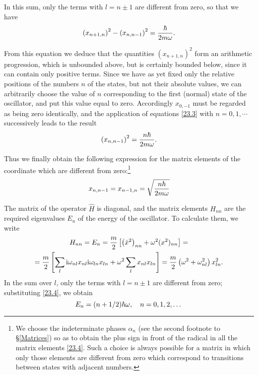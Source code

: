 In this sum, only the terms with $ l = n \pm 1 $ are different from zero, so that we have
\begin{equation}\label{23.3}
\left(x_{n+1,n}\right)^2-\left(x_{n,n-1}\right)^2=\frac{\hbar}{2m\omega}.
\end{equation}


From this equation we deduce that the quantities $  \left(x_{n+1,n}\right)^2$ form an arithmetic progression, which is unbounded above, but is certainly bounded below, since it can contain only positive terms. Since we have as yet fixed only the relative positions of the numbers $ n $ of the states, but not their absolute values, we can arbitrarily choose the value of $ n $ corresponding to the first (normal) state of the oscillator, and put this value equal to zero. Accordingly $ x_{0,−1} $ must be regarded as being zero identically, and the application of equations \eqref{23.3} with $ n = 0, 1,\cdots $ successively leads to the result
\[ \left(x_{n,n-1}\right)^2=\frac{n\hbar}{2m\omega} .\]



Thus we finally obtain the following expression for the matrix elements of the coordinate which are different from zero:\footnote{We choose the indeterminate phases $\alpha_n$ (see the second footnote to \S\ref{Matrices}) so as to obtain the plus sign in front of the radical in all the matrix elements \eqref{23.4}. Such a choice is always possible for a matrix in which only those elements are different from zero which correspond to transitions between states with adjacent numbers.
}
\begin{equation}\label{23.4}
x_{n,n-1}=x_{n-1,n}=\sqrt{\frac{n\hbar}{2m\omega}}
\end{equation}


The matrix of the operator $\hat{H}$ is diagonal, and the matrix elements $ H_{nn} $ are the required eigenvalues $ E_n $ of the energy of the oscillator. To calculate them, we write
\begin{multline*}
H_{nn}=E_n=\frac{m}{2}\left[ \left(\dot{x}^2\right)_{nn}+\omega^2(x^2)_{nn}\right]=\\
=\frac{m}{2}\left[\sum_l\mathrm{i}\omega_{nl}x_{nl}\mathrm{i}\omega_{ln}x_{ln}+\omega^2\sum_lx_{nl}x_{ln}  \right]=\frac{m}{2}\left(\omega^2+\omega_{nl}^2\right)x_{ln}^2.
\end{multline*}
In the sum over $ l $, only the terms with $ l = n\pm1 $ are different from zero; substituting \eqref{23.4}, we obtain
\begin{equation}\label{23.5}
E_n=(n+1/2)\hbar\omega,\quad n=0,1,2,\dots
\end{equation}


